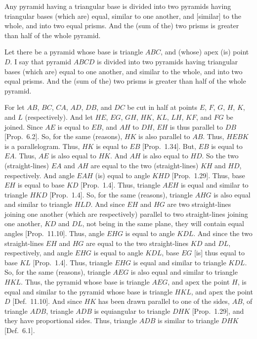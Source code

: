 \begin{Parallel}{}{}
{Any pyramid having a triangular base is divided into two
pyramids having triangular bases (which are) equal, similar to one another, and [similar] to the whole, and into two equal prisms. And the (sum of the) two prisms is greater than half of the
whole pyramid.

\epsfysize=2.2in
\centerline{}

Let there be a pyramid whose base is triangle $ABC$, and (whose) apex (is) point $D$. I say that
pyramid $ABCD$ is divided into two pyramids having triangular bases (which are) equal
to one another, and similar to the whole, and into two equal prisms. And the (sum of the)
two prisms is greater than half of the whole pyramid.

For let $AB$, $BC$, $CA$, $AD$, $DB$, and $DC$ be cut in half at points $E$, $F$, $G$,
$H$, $K$, and $L$ (respectively). And let $HE$, $EG$, $GH$, $HK$, $KL$, $LH$, $KF$, and $FG$
be joined. Since $AE$ is equal to $EB$, and $AH$ to $DH$, $EH$ is thus parallel to
$DB$ [Prop.~6.2]. So, for the same (reasons), $HK$ is also parallel
to $AB$. Thus, $HEBK$ is a parallelogram. Thus, $HK$ is equal to $EB$ [Prop.~1.34]. But, $EB$ is equal to $EA$. Thus, $AE$ is also equal to $HK$. And $AH$
is also equal to $HD$. So the two (straight-lines) $EA$ and $AH$ are equal to the two
(straight-lines) $KH$ and $HD$, respectively. And angle $EAH$ (is) equal to angle
$KHD$ [Prop.~1.29]. Thus, base $EH$ is equal to base $KD$ [Prop.~1.4]. Thus, triangle $AEH$ is equal and similar to triangle $HKD$
[Prop.~1.4]. So, for the same (reasons), triangle $AHG$
is also equal and similar to triangle $HLD$. And since $EH$ and $HG$ are two
straight-lines joining one another (which are respectively) parallel to two straight-lines
joining one another, $KD$ and $DL$, not being in the same plane, they will contain
equal angles [Prop.~11.10]. Thus, angle $EHG$ is equal to angle
$KDL$. And since the two straight-lines $EH$ and $HG$ are equal to the two straight-lines
$KD$ and $DL$, respectively, and angle $EHG$ is equal to angle $KDL$, base $EG$
[is] thus equal to base $KL$ [Prop.~1.4]. Thus, triangle $EHG$ is equal
and similar to triangle $KDL$. So, for the same (reasons), triangle $AEG$ is also equal and
similar to triangle $HKL$. Thus, the pyramid whose base is triangle $AEG$,
and apex the point $H$, is equal and similar to the pyramid whose base is triangle $HKL$,
and apex the point $D$ [Def.~11.10]. And since $HK$ has been drawn
parallel to one of the sides, $AB$, of triangle $ADB$, triangle $ADB$
is equiangular to triangle $DHK$ [Prop.~1.29], and they have proportional sides. Thus, triangle $ADB$ is similar to triangle $DHK$ [Def.~6.1].
}
\end{Parallel}
